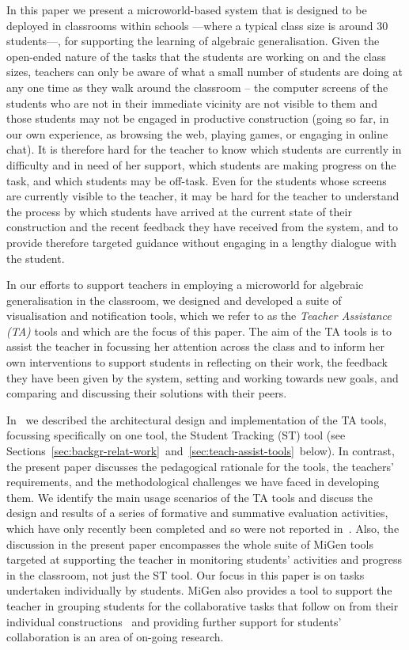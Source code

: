In this paper we present a microworld-based system that is designed to
be deployed in classrooms within schools ---where a typical class size
is around 30 students---, for supporting the learning of algebraic
generalisation. Given the
open-ended nature of the tasks that the students are working on and
the class sizes, teachers can only be aware of what a small number of
students are doing at any one time as they walk around the classroom –
the computer screens of the students who are not in their immediate
vicinity are not visible to them and those students may not be engaged
in productive construction (going so far, in our own experience, as
browsing the web, playing games, or engaging in online chat). It is
therefore hard for the teacher to know which students are currently in
difficulty and in need of her support, which students are making
progress on the task, and which students may be off-task. Even for the
students whose screens are currently visible to the teacher, it may be
hard for the teacher to understand the process by which students have
arrived at the current state of their construction and the recent
feedback they have received from the system, and to provide therefore
targeted guidance without engaging in a lengthy dialogue with the
student.
 
In our efforts to support teachers in
employing a microworld for algebraic generalisation in the classroom,
we designed and developed a suite of visualisation and notification
tools, which we refer to as the {\em Teacher Assistance (TA)} tools
and which are the focus of this paper. The aim of the TA tools is to
assist the teacher in focussing her attention across the class and to
inform her own interventions to support students in reflecting on
their work, the feedback they have been given by the system, setting
and working towards new goals, and comparing and discussing their
solutions with their peers. 

In~\cite{ectel2010-TA,IEEE-TLT-TA} we described the architectural design
and implementation of the TA tools, focussing specifically on one
tool, the Student Tracking (ST) tool (see
Sections~\ref{sec:backgr-relat-work}~and~\ref{sec:teach-assist-tools}~below). 
In contrast, the present paper discusses the pedagogical rationale for
the tools, the teachers’ requirements, and the methodological
challenges we have faced in developing them. We identify the main
usage scenarios of the TA tools and discuss the design and results of
a series of formative and summative evaluation activities, which have
only recently been completed and so were not reported
in~\cite{ectel2010-TA,IEEE-TLT-TA}. 
Also, the discussion in the present paper
encompasses the whole suite of MiGen tools targeted at supporting the
teacher in monitoring students’ activities and progress in the
classroom, not just the ST tool.  Our focus in this paper is on tasks
undertaken individually by students. MiGen also provides a tool to
support the teacher in grouping students for the collaborative tasks
that follow on from their individual constructions~\cite{GroupingTool}
and providing further support for
students’ collaboration is an area of on-going research.
 
